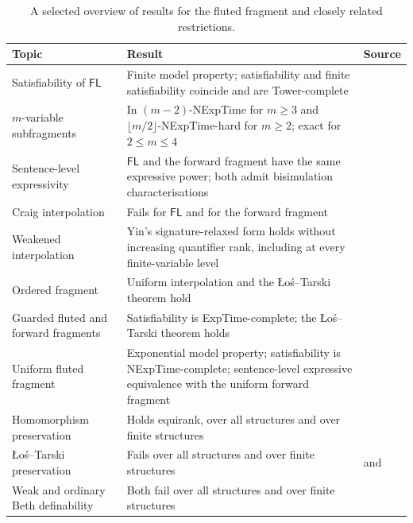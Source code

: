 \documentclass{lmcs}
\newcommand{\FL}{\mathsf{FL}}
\begin{document}
\begin{table}[ht]
\centering
\small
\renewcommand{\arraystretch}{1.12}
\begin{tabular}{@{}L{0.24\textwidth}L{0.48\textwidth}L{0.21\textwidth}@{}}
\toprule
\textbf{Topic} & \textbf{Result} & \textbf{Source}\\
\midrule
Satisfiability of $\FL$
  & Finite model property; satisfiability and finite satisfiability coincide
    and are Tower-complete
  & \cite{Purdy1996,PrattHartmannSzwastTendera2019,BednarczykKojelisPrattHartmann2025}\\
$m$-variable subfragments
  & In $(m-2)$-NExpTime for $m\geq3$ and
    $\lfloor m/2\rfloor$-NExpTime-hard for $m\geq2$; exact for
    $2\leq m\leq4$
  & \cite{PrattHartmannSzwastTendera2019}\\
Sentence-level expressivity
  & $\FL$ and the forward fragment have the same expressive power; both admit
    bisimulation characterisations
  & \cite{BednarczykJaakkola2022}\\
Craig interpolation
  & Fails for $\FL$ and for the forward fragment
  & \cite{BednarczykJaakkola2022}\\
Weakened interpolation
  & Yin's signature-relaxed form holds without increasing quantifier rank,
    including at every finite-variable level
  & \cite{YinSavingCraig2026}\\
Ordered fragment
  & Uniform interpolation and the \L o\'s--Tarski theorem hold
  & \cite{YinOrdered2026}\\
Guarded fluted and forward fragments
  & Satisfiability is ExpTime-complete; the \L o\'s--Tarski theorem holds
  & \cite{Bednarczyk2021,YinGuarded2026}\\
Uniform fluted fragment
  & Exponential model property; satisfiability is NExpTime-complete; sentence-level
    expressive equivalence with the uniform forward fragment
  & \cite{YinUniformFluted2026}\\
Homomorphism preservation
  & Holds equirank, over all structures and over finite structures
  & \\
\L o\'s--Tarski preservation
  & Fails over all structures and over finite structures
  &  and \\
Weak and ordinary Beth definability
  & Both fail over all structures and over finite structures
  & \\
\bottomrule
\end{tabular}
\caption{A selected overview of results for the fluted fragment and closely related restrictions.}
\label{tab:fluted-landscape}
\end{table}
\end{document}
